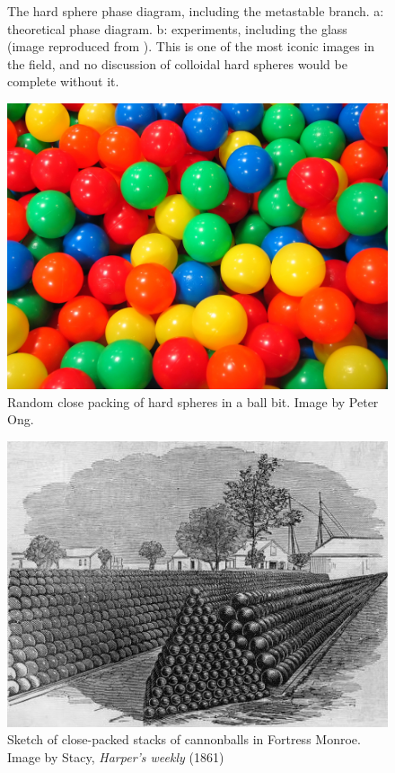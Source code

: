 \documentclass[11pt,twoside]{report}
\begin{document}
\begin{figure}
  \missingfigure[figwidth=\linewidth]{}%
  \caption[The hard sphere phase diagram]{
    The hard sphere phase diagram, including the metastable branch.
    a: theoretical phase diagram.
    b: experiments, including the glass (image reproduced from \cite{?}).
    This is one of the most iconic images in the field, and no discussion of colloidal hard spheres would be complete without it.}
  \label{fig:hs-phase-diagram}
\end{figure}

\begin{figure}
  \includegraphics[width=\linewidth]{ball-pit-horizontal}
  \caption[Random close packing in a ball pit]{
    Random close packing of hard spheres in a ball bit.
    Image by Peter Ong.}
  \label{fig:rcp}
\end{figure}

\begin{figure}
  \includegraphics[width=\linewidth]{cannonballs}
  \caption[Close packed cannonballs]{
    Sketch of close-packed stacks of cannonballs in Fortress Monroe.
    Image by Stacy, \emph{Harper's weekly} (1861)}
  \label{fig:fcc}
\end{figure}
\end{document}
